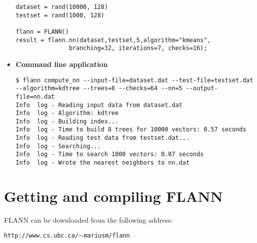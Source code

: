 \documentclass[letter,10pt]{article}
\begin{document}
\begin{itemize}
\begin{Verbatim}[fontsize=\scriptsize,frame=single]
dataset = rand(10000, 128)
testset = rand(1000, 128)

flann = FLANN()
result = flann.nn(dataset,testset,5,algorithm="kmeans",
               branching=32, iterations=7, checks=16);
\end{Verbatim}

\item \textbf{Command line application}



\begin{Verbatim}[fontsize=\scriptsize,frame=single]
$ flann compute_nn --input-file=dataset.dat --test-file=testset.dat 
--algorithm=kdtree --trees=8 --checks=64 --nn=5 --output-file=nn.dat
Info  log - Reading input data from dataset.dat
Info  log - Algorithm: kdtree
Info  log - Building index...
Info  log - Time to build 8 trees for 10000 vectors: 0.57 seconds
Info  log - Reading test data from testset.dat...
Info  log - Searching...
Info  log - Time to search 1000 vectors: 0.07 seconds
Info  log - Wrote the nearest neighbors to nn.dat
\end{Verbatim}

\end{itemize}



\section{Getting and compiling FLANN}

FLANN can be downloaded from the following address:
\begin{center}
\texttt{http://www.cs.ubc.ca/$\sim$mariusm/flann}
\end{center}
\end{document}
